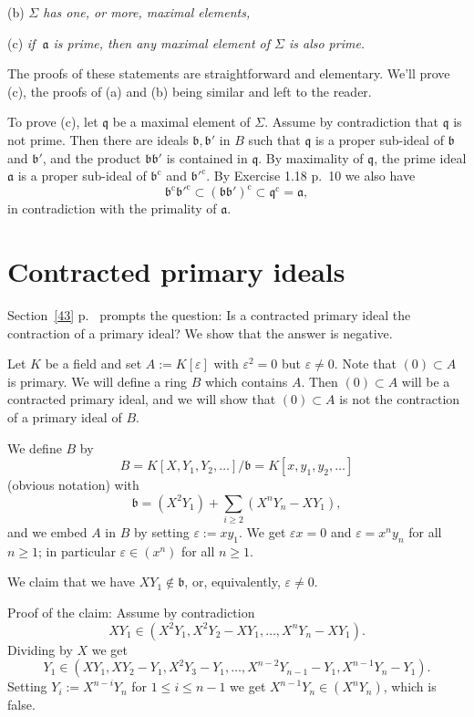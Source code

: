 \documentclass[12pt]{article}
\newcommand{\oo}{\operatorname}
\newcommand{\mf}{\mathfrak}
\newcommand{\aaa}{\mf a}
\newcommand{\bbb}{\mf b}
\begin{document}
(b) \emph{$\Sigma$ has one, or more, maximal elements,}

(c) \emph{if $\ \aaa$ is prime, then any maximal element of $\Sigma$ is also prime.}

The proofs of these statements are straightforward and elementary. We'll prove (c), the proofs of (a) and (b) being similar and left to the reader.

To prove (c), let $\mf q$ be a maximal element of $\Sigma$. Assume by contradiction that $\mf q$ is not prime. Then there are ideals $\mf{b,b}'$ in $B$ such that $\mf q$ is a proper sub-ideal of $\bbb$ and $\bbb'$, and the product $\mf{bb}'$ is contained in $\mf q$. By maximality of $\mf q$, the prime ideal $\aaa$ is a proper sub-ideal of $\bbb^{\oo c}$ and $\bbb'^{\oo c}$. By Exercise 1.18 p.~10 we also have 
$$
\bbb^{\oo c}\bbb'^{\oo c}\subset(\mf{bb}')^{\oo c}\subset\mf q^{\oo c}=\aaa,
$$ 
in contradiction with the primality of $\aaa$.

\section{Contracted primary ideals}\label{cpi}%

Section~\ref{43} p.~\pageref{43} prompts the question: Is a contracted primary ideal the contraction of a primary ideal? We show that the answer is negative.


Let $K$ be a field and set $A:=K[\varepsilon]$ with $\varepsilon^2=0$ but $\varepsilon\ne0$. Note that $(0)\subset A$ is primary. We will define a ring $B$ which contains $A$. Then $(0)\subset A$ will be a contracted primary ideal, and we will show that $(0)\subset A$ is not the contraction of a primary ideal of $B$. 

We define $B$ by 
$$
B=K[X,Y_1,Y_2,\dots]/\mathfrak b=K[x,y_1,y_2,\dots]
$$ 
(obvious notation) with 
$$
\mathfrak b=(X^2Y_1)+\sum_{i\ge2}(X^nY_n-XY_1),
$$
and we embed $A$ in $B$ by setting $\varepsilon:=xy_1$. We get $\varepsilon x=0$ and $\varepsilon=x^ny_n$ for all $n\ge1$; in particular $\varepsilon\in(x^n)$ for all $n\ge1$.

We claim that we have $XY_1\notin\mathfrak b$, or, equivalently, $\varepsilon\ne0$.

Proof of the claim: Assume by contradiction 
$$
XY_1\in(X^2Y_1,X^2Y_2-XY_1,\dots,X^nY_n-XY_1).
$$ 
Dividing by $X$ we get 
$$
Y_1\in(XY_1,XY_2-Y_1,X^2Y_3-Y_1,\dots,X^{n-2}Y_{n-1}-Y_1,X^{n-1}Y_n-Y_1).
$$ 
Setting $Y_i:=X^{n-i}Y_n$ for $1\le i\le n-1$ we get $X^{n-1}Y_n\in(X^nY_n)$, which is false. 
\end{document}
